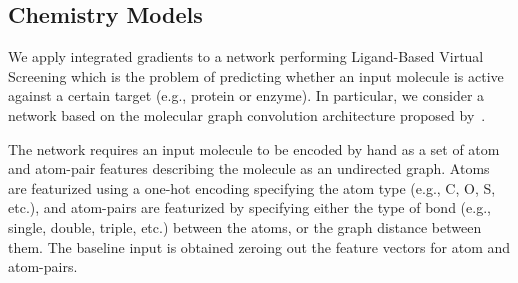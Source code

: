 

\subsection{Chemistry Models}\label{sec:app-chem}
We apply integrated gradients to a network performing Ligand-Based
Virtual Screening which is the problem of predicting whether an input
molecule is active against a certain target (e.g., protein or enzyme).
In particular, we consider a network based on the molecular graph
convolution architecture proposed by~\cite{KMBPR16}.

The network requires an input
molecule to be encoded by hand as a set of atom and atom-pair features
describing the molecule as an undirected graph. Atoms are featurized
using a one-hot encoding specifying the atom type (e.g., C, O, S,
etc.), and atom-pairs are featurized by specifying either the type of
bond (e.g., single, double, triple, etc.)  between the atoms, or the
graph distance between them.
The baseline input is obtained zeroing out the feature vectors for
atom and atom-pairs.

